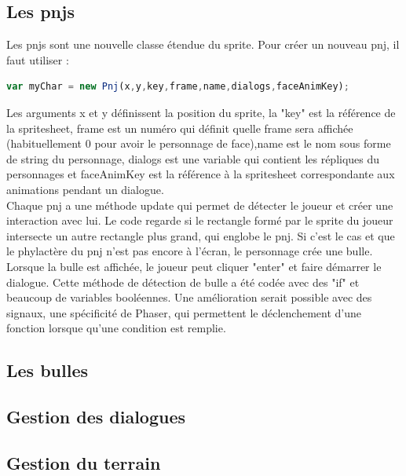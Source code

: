 \documentclass[11pt]{article}
\begin{document}
\subsection{Les pnjs}
Les pnjs sont une nouvelle classe étendue du sprite. Pour créer un nouveau pnj, il faut utiliser :
 \begin{lstlisting}[language=JavaScript]
var myChar = new Pnj(x,y,key,frame,name,dialogs,faceAnimKey);
\end{lstlisting}
Les arguments x et y définissent la position du sprite, la "key" est la référence de la spritesheet, frame est un numéro qui définit quelle frame sera affichée (habituellement 0 pour avoir le personnage de face),name est le nom sous forme de string du personnage, dialogs est une variable qui contient les répliques du personnages et faceAnimKey est la référence à la spritesheet correspondante aux animations pendant un dialogue. 
\\ Chaque pnj a une méthode update qui permet de détecter le joueur et créer une interaction avec lui. Le code regarde si le rectangle formé par le sprite du joueur intersecte un autre rectangle plus grand, qui englobe le pnj. Si c'est le cas et que le phylactère du pnj n'est pas encore à l'écran, le personnage crée une bulle. Lorsque la bulle est affichée, le joueur peut cliquer "enter" et faire démarrer le dialogue. Cette méthode de détection de bulle a été codée avec des "if" et beaucoup de variables booléennes. Une amélioration serait possible avec des signaux, une spécificité de Phaser, qui permettent le déclenchement d'une fonction lorsque qu'une condition est remplie.

\subsection{Les bulles}
\subsection{Gestion des dialogues}
\subsection{Gestion du terrain}
\end{document}
